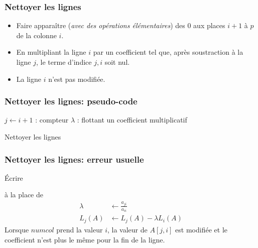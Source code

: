 \begin{frame}
  \frametitle{Nettoyer les lignes}
\begin{itemize}
  \item Faire apparaître (\emph{avec des opérations élémentaires}) des $0$ aux places $i+1$ à $p$ de la colonne $i$.
  \item En multipliant la ligne $i$ par un coefficient tel que, après soustraction à la ligne $j$, le terme d'indice $j,i$ soit nul.
  \item La ligne $i$ n'est pas modifiée.
\end{itemize}
\end{frame}

\begin{frame}
  \frametitle{Nettoyer les lignes: pseudo-code}
\begin{algorithm}[H]
  $j\leftarrow i+1$ : compteur\;
  $\lambda$ : flottant un coefficient multiplicatif\;
  \caption{Nettoyer les lignes}
  \label{resolsystlin_2}
\end{algorithm}
\end{frame}

\begin{frame}
  \frametitle{Nettoyer les lignes: erreur usuelle}
\'Ecrire
\begin{algorithm}[H]
\end{algorithm}
à la place de
\begin{align*}
    \lambda &\leftarrow \frac{a_{j i}}{a_{i i}}\\
    L_j(A)  &\leftarrow L_j(A)-\lambda L_i(A)  
\end{align*}
Lorsque $numcol$ prend la valeur $i$, la valeur de $A[j,i]$ est modifiée et le coefficient n'est plus le même pour la fin de la ligne.
\end{frame}

